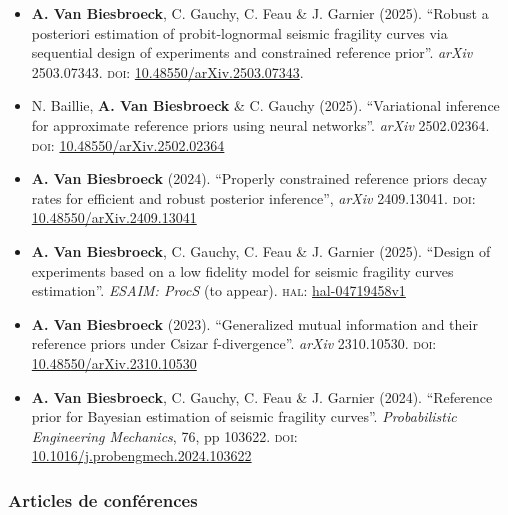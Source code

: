 \begin{itemize}
    \item \textbf{A. Van Biesbroeck}, C. Gauchy, C. Feau \& J. Garnier (2025). ``Robust a posteriori estimation of probit-lognormal seismic fragility curves via sequential design of experiments and constrained reference prior''. \emph{arXiv} 2503.07343. \textsc{doi:} \href{https://dx.doi.org/10.48550/arXiv.2503.07343}{10.48550/arXiv.2503.07343}.
    \item N. Baillie, \textbf{A. Van Biesbroeck} \& C. Gauchy (2025). ``Variational inference for approximate reference priors using neural networks''. \emph{arXiv} 2502.02364. \textsc{doi:} \href{https://dx.doi.org/10.48550/arXiv.2502.02364}{10.48550/arXiv.2502.02364}
    \item \textbf{A. Van Biesbroeck} (2024). ``Properly constrained reference priors decay rates for efficient and robust posterior inference'', \emph{arXiv} 2409.13041. \textsc{doi:} \href{https://dx.doi.org/10.48550/arXiv.2409.13041}{10.48550/arXiv.2409.13041}
    \item \textbf{A. Van Biesbroeck}, C. Gauchy, C. Feau \& J. Garnier (2025). ``Design of experiments based on a low fidelity model for seismic fragility curves estimation''. \emph{ESAIM: ProcS} (to appear). \textsc{hal:} \href{https://hal.science/hal-04719458v1}{hal-04719458v1}
    \item \textbf{A. Van Biesbroeck} (2023). ``Generalized mutual information and their reference priors under Csizar f-divergence''. \emph{arXiv} 2310.10530. \textsc{doi:} \href{https://dx.doi.org/10.48550/arXiv.2310.10530}{10.48550/arXiv.2310.10530}
    \item \textbf{A. Van Biesbroeck}, C. Gauchy, C. Feau \& J. Garnier (2024). ``Reference prior for Bayesian estimation of seismic fragility curves''. \emph{Probabilistic Engineering Mechanics}, 76, pp 103622. \textsc{doi:} \href{https://dx.doi.org/10.1016/j.probengmech.2024.103622}{10.1016/j.probengm\-ech.2024.103622}
\end{itemize}



\subsubsection{Articles de conférences}

